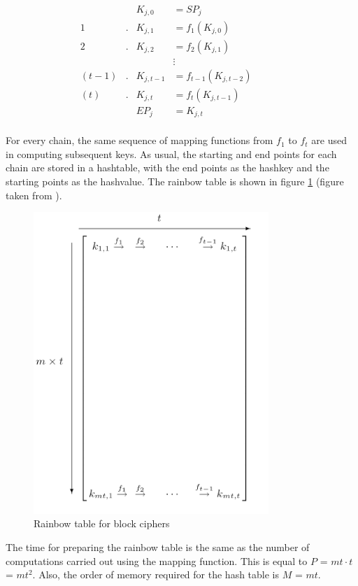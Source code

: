 \begin{align*}
& & K_{j,0} & = SP_j & & & &\\
1&. &K_{j,1} & = f_1(K_{j,0}) & & & &\\
2&. &K_{j,2} & = f_2(K_{j,1}) & & & &\\
& & &\vdots & & & &\\
(t-1)&. &K_{j,t-1} & = f_{t-1}(K_{j,t-2}) & & & &\\
(t)&. &K_{j,t} & = f_t(K_{j,t-1}) & & & &\\
& & EP_j & = K_{j,t} & & & &\\
\end{align*}

For every chain, the same sequence of mapping functions from $f_1$ to $f_t$ are used in computing subsequent keys. As usual, the starting and end points for each chain are stored in a hashtable, with the end points as the hashkey and the starting points as the hashvalue. The rainbow table is shown in figure \ref{fig:rainbow-table} (figure taken from \cite{oechslin:mfc}).

\begin{figure}[ht!]
	\centering
		\includegraphics[width=3.5in]{./figures/rainbow-table.PNG}
	\caption{Rainbow table for block ciphers \cite{oechslin:mfc}}	
	\label{fig:rainbow-table}
\end{figure}

The time for preparing the rainbow table is the same as the number of computations carried out using the mapping function. This is equal to $P$ = $mt \cdot t$ = $mt^2$. Also, the order of memory required for the hash table is $M$ = $mt$. \\


